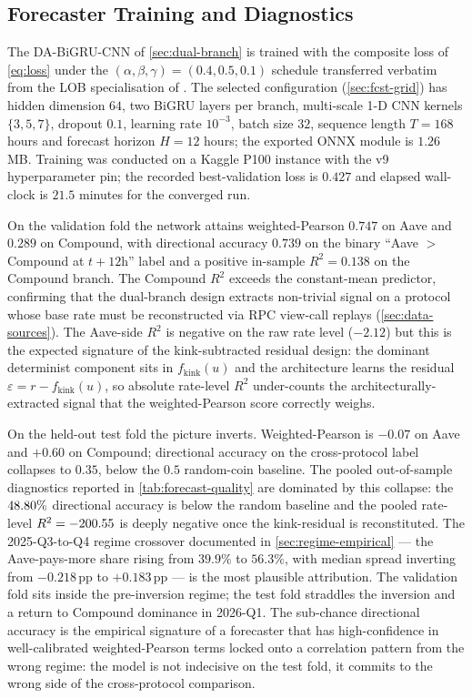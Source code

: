 \subsection{Forecaster Training and Diagnostics}
\label{sec:defi-forecaster-narrative}

The DA-BiGRU-CNN of \cref{sec:dual-branch} is trained with the
composite loss of \cref{eq:loss} under the
$(\alpha,\beta,\gamma)=(0.4,0.5,0.1)$ schedule transferred verbatim
from the LOB specialisation of \cite{solovev2026lob}. The selected
configuration (\cref{sec:fcst-grid}) has hidden dimension $64$, two
BiGRU layers per branch, multi-scale 1-D CNN kernels
$\{3,5,7\}$, dropout $0.1$, learning rate $10^{-3}$, batch size $32$,
sequence length $T=168$ hours and forecast horizon $H=12$ hours; the
exported ONNX module is $1.26$\,MB. Training was conducted on a
Kaggle P100 instance with the v9 hyperparameter pin; the recorded
best-validation loss is $0.427$ and elapsed wall-clock is
$21.5$ minutes for the converged run.

On the validation fold the network attains weighted-Pearson $0.747$
on Aave and $0.289$ on Compound, with directional accuracy $0.739$
on the binary ``Aave $>$ Compound at $t+12\mathrm{h}$'' label and a
positive in-sample $R^{2}=0.138$ on the Compound branch. The
Compound $R^{2}$ exceeds the constant-mean predictor, confirming that
the dual-branch design extracts non-trivial signal on a protocol whose
base rate must be reconstructed via RPC view-call replays
(\cref{sec:data-sources}). The Aave-side $R^{2}$ is negative on the
raw rate level ($-2.12$) but this is the expected signature of the
kink-subtracted residual design: the dominant determinist component
sits in $f_{\text{kink}}(u)$ and the architecture learns the residual
$\varepsilon = r-f_{\text{kink}}(u)$, so absolute rate-level $R^{2}$
under-counts the architecturally-extracted signal that the
weighted-Pearson score correctly weighs.

On the held-out test fold the picture inverts. Weighted-Pearson is
$-0.07$ on Aave and $+0.60$ on Compound; directional accuracy on the
cross-protocol label collapses to $0.35$, below the $0.5$ random-coin
baseline. The pooled out-of-sample diagnostics reported in
\cref{tab:forecast-quality} are dominated by this collapse: the
$48.80\%{}$ directional accuracy is below the random baseline
and the pooled rate-level $R^{2}=-200.55$ is deeply negative
once the kink-residual is reconstituted. The 2025-Q3-to-Q4 regime
crossover documented in \cref{sec:regime-empirical} --- the
Aave-pays-more share rising from $39.9\%$ to $56.3\%$, with median
spread inverting from $-0.218$\,pp to $+0.183$\,pp --- is the most
plausible attribution. The validation fold sits inside the
pre-inversion regime; the test fold straddles the inversion and a
return to Compound dominance in 2026-Q1. The sub-chance directional
accuracy is the empirical signature of a forecaster that has
high-confidence in well-calibrated weighted-Pearson terms locked
onto a correlation pattern from the wrong regime: the model is not
indecisive on the test fold, it commits to the wrong side of the
cross-protocol comparison.

